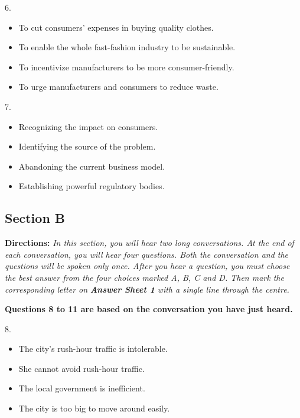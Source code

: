 \documentclass[UTF8,11pt]{ctexart}
\begin{document}
6.


\begin{itemize}[leftmargin=2em,itemsep=.2em,topsep=.4em]\item[A.] To cut consumers’ expenses in buying quality clothes.
\item[B.] To enable the whole fast-fashion industry to be sustainable.
\item[C.] To incentivize manufacturers to be more consumer-friendly.
\item[D.] To urge manufacturers and consumers to reduce waste.
\end{itemize}

7.


\begin{itemize}[leftmargin=2em,itemsep=.2em,topsep=.4em]\item[A.] Recognizing the impact on consumers.
\item[B.] Identifying the source of the problem.
\item[C.] Abandoning the current business model.
\item[D.] Establishing powerful regulatory bodies.
\end{itemize}

\subsection*{\textbf{Section B}}


\textbf{Directions:} \textit{In this section, you will hear two long conversations. At the end of each conversation, you will hear} \textit{four questions. Both the conversation and the questions will be spoken only once. After you hear a question, you} \textit{must choose the best answer from the four choices marked A, B, C and D. Then mark the corresponding letter on} \textbf{\textit{Answer Sheet 1}}\textit{ with a single line through the centre.}


\textbf{Questions 8 to 11 are based on the conversation you have just heard.}


8.


\begin{itemize}[leftmargin=2em,itemsep=.2em,topsep=.4em]\item[A.] The city’s rush-hour traffic is intolerable.
\item[B.] She cannot avoid rush-hour traffic.
\item[C.] The local government is inefficient.
\item[D.] The city is too big to move around easily.
\end{itemize}
\end{document}
